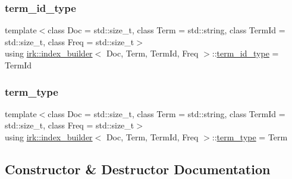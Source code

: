 \mbox{\label{classirk_1_1index__builder_a6736f4a9aa142d3ca15c5e8c3b0a352f}} 
\subsubsection{\texorpdfstring{term\+\_\+id\+\_\+type}{term\_id\_type}}
{\footnotesize\ttfamily template$<$class Doc  = std\+::size\+\_\+t, class Term  = std\+::string, class Term\+Id  = std\+::size\+\_\+t, class Freq  = std\+::size\+\_\+t$>$ \\
using \mbox{\hyperlink{classirk_1_1index__builder}{irk\+::index\+\_\+builder}}$<$ Doc, Term, Term\+Id, Freq $>$\+::\mbox{\hyperlink{classirk_1_1index__builder_a6736f4a9aa142d3ca15c5e8c3b0a352f}{term\+\_\+id\+\_\+type}} =  Term\+Id}

\mbox{\label{classirk_1_1index__builder_ad80a8f10f3e72ed3b9a2f181350f3f1f}} 
\subsubsection{\texorpdfstring{term\+\_\+type}{term\_type}}
{\footnotesize\ttfamily template$<$class Doc  = std\+::size\+\_\+t, class Term  = std\+::string, class Term\+Id  = std\+::size\+\_\+t, class Freq  = std\+::size\+\_\+t$>$ \\
using \mbox{\hyperlink{classirk_1_1index__builder}{irk\+::index\+\_\+builder}}$<$ Doc, Term, Term\+Id, Freq $>$\+::\mbox{\hyperlink{classirk_1_1index__builder_ad80a8f10f3e72ed3b9a2f181350f3f1f}{term\+\_\+type}} =  Term}



\subsection{Constructor \& Destructor Documentation}
\mbox{\label{classirk_1_1index__builder_a828accec899ce3440bc52268ed3979fa}} 
